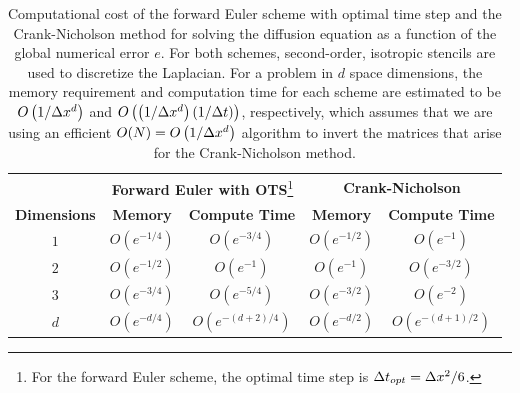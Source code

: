 \documentclass[oneeqnum,onefignum,onetabnum,onethmnum]{siamltex}
\begin{document}
\begin{table}[!t]
\caption{\label{tab:comp_perf_vs_dim}
   Computational cost of the forward Euler scheme with optimal time step and 
   the Crank-Nicholson method for solving the diffusion equation as a function 
   of the global numerical error $e$.
   For both schemes, second-order, isotropic stencils are used to discretize 
   the Laplacian.  For a problem in $d$ space dimensions, the memory 
   requirement and computation time for each scheme are estimated to be 
   $O \left(1/\Delta x^d \right)$ and 
   $O\left( \left(1/\Delta x^d \right) (1/\Delta t) \right)$, respectively, which 
   assumes that we are using an efficient 
   $O(N) = O \left( 1/\Delta x^d \right)$ algorithm to invert the matrices that 
   arise for the Crank-Nicholson method.
}
\begin{minipage}{\textwidth}
\begin{center} \footnotesize
\renewcommand{\arraystretch}{1.5}
\begin{tabular}{|c|c|c|c|c|}
  \hline
  & \multicolumn{2}{|c|}{{\bf Forward Euler with OTS}\footnote{For the forward 
    Euler scheme, the optimal time step is $\Delta t_{opt} = \Delta x^2/6$.}}
  & \multicolumn{2}{|c|}{\bf Crank-Nicholson} \\
  \cline{2-3} \cline{4-5} 
    {\bf Dimensions} & {\bf Memory} & {\bf Compute Time} 
  & {\bf Memory} & {\bf Compute Time} \\
  \hline 
  $1$ & $O\left( e^{-1/4} \right)$ 
      & $O\left( e^{-3/4} \right)$ 
      & $O\left( e^{-1/2} \right)$ 
      & $O\left( e^{-1} \right)$ \\ 
  $2$ & $O\left( e^{-1/2} \right)$ 
      & $O\left( e^{-1} \right)$ 
      & $O\left( e^{-1} \right)$ 
      & $O\left( e^{-3/2} \right)$ \\ 
  $3$ & $O\left( e^{-3/4} \right)$ 
      & $O\left( e^{-5/4} \right)$ 
      & $O\left( e^{-3/2} \right)$ 
      & $O\left( e^{-2} \right)$ \\
  $d$ & $O\left( e^{-d/4} \right)$ 
      & $O\left( e^{-(d+2)/4} \right)$ 
      & $O\left( e^{-d/2} \right)$ 
      & $O\left( e^{-(d+1)/2} \right)$ \\ 
  \hline 
\end{tabular}
\end{center}
\end{minipage}
\end{table}
\end{document}

